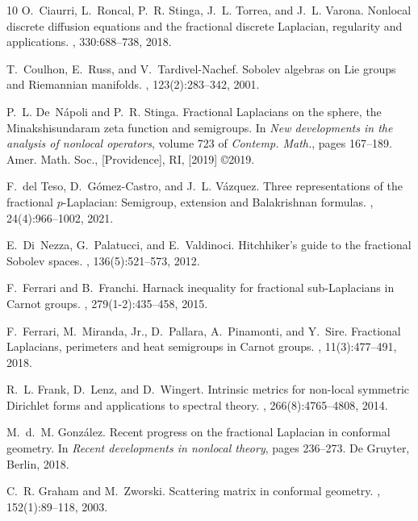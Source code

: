 \documentclass[11pt]{amsart}
\theoremstyle{plain}
\theoremstyle{definition}
\numberwithin{equation}{section}
\begin{document}
\begin{thebibliography}{10}
O.~Ciaurri, L.~Roncal, P.~R. Stinga, J.~L. Torrea, and J.~L. Varona.
\newblock Nonlocal discrete diffusion equations and the fractional discrete
  {L}aplacian, regularity and applications.
, 330:688--738, 2018.

T.~Coulhon, E.~Russ, and V.~Tardivel-Nachef.
\newblock Sobolev algebras on {L}ie groups and {R}iemannian manifolds.
, 123(2):283--342, 2001.

P.~L. De~N\'{a}poli and P.~R. Stinga.
\newblock Fractional {L}aplacians on the sphere, the {M}inakshisundaram zeta
  function and semigroups.
\newblock In {\em New developments in the analysis of nonlocal operators},
  volume 723 of {\em Contemp. Math.}, pages 167--189. Amer. Math. Soc.,
  [Providence], RI, [2019] \copyright 2019.

F.~del Teso, D.~G\'{o}mez-Castro, and J.~L. V\'{a}zquez.
\newblock Three representations of the fractional {$p$}-{L}aplacian:
  {S}emigroup, extension and {B}alakrishnan formulas.
, 24(4):966--1002, 2021.

E.~Di~Nezza, G.~Palatucci, and E.~Valdinoci.
\newblock Hitchhiker's guide to the fractional {S}obolev spaces.
, 136(5):521--573, 2012.

F.~Ferrari and B.~Franchi.
\newblock Harnack inequality for fractional sub-{L}aplacians in {C}arnot
  groups.
, 279(1-2):435--458, 2015.

F.~Ferrari, M.~Miranda, Jr., D.~Pallara, A.~Pinamonti, and Y.~Sire.
\newblock Fractional {L}aplacians, perimeters and heat semigroups in {C}arnot
  groups.
, 11(3):477--491, 2018.

R.~L. Frank, D.~Lenz, and D.~Wingert.
\newblock Intrinsic metrics for non-local symmetric {D}irichlet forms and
  applications to spectral theory.
, 266(8):4765--4808, 2014.

M.~d.~M. Gonz\'{a}lez.
\newblock Recent progress on the fractional {L}aplacian in conformal geometry.
\newblock In {\em Recent developments in nonlocal theory}, pages 236--273. De
  Gruyter, Berlin, 2018.

C.~R. Graham and M.~Zworski.
\newblock Scattering matrix in conformal geometry.
, 152(1):89--118, 2003.


\end{thebibliography}
\end{document}
